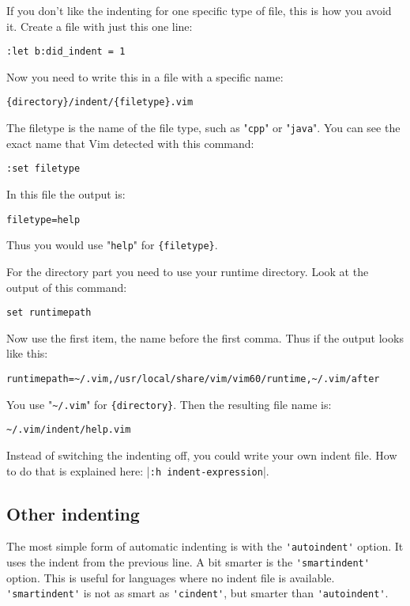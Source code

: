If you don't like the indenting for one specific type of file, this is how you avoid it.
Create a file with just this one line:

\begin{Verbatim}[samepage=true]
 :let b:did_indent = 1
\end{Verbatim}

Now you need to write this in a file with a specific name:

\begin{Verbatim}[samepage=true]
    {directory}/indent/{filetype}.vim
\end{Verbatim}

The {filetype} is the name of the file type, such as "\verb!cpp!" or "\verb!java!".
You can see the exact name that Vim detected with this command:

\begin{Verbatim}[samepage=true]
 :set filetype
\end{Verbatim}

In this file the output is:

\begin{Verbatim}[samepage=true]
    filetype=help 
\end{Verbatim}

Thus you would use "\verb!help!" for \verb!{filetype}!.

For the {directory} part you need to use your runtime directory.
Look at the output of this command:

\begin{Verbatim}[samepage=true]
 set runtimepath
\end{Verbatim}

Now use the first item, the name before the first comma.
Thus if the output looks like this:

\begin{Verbatim}[samepage=true]
    runtimepath=~/.vim,/usr/local/share/vim/vim60/runtime,~/.vim/after 
\end{Verbatim}

You use "\verb!~/.vim!" for \verb!{directory}!.
Then the resulting file name is:

\begin{Verbatim}[samepage=true]
    ~/.vim/indent/help.vim 
\end{Verbatim}

Instead of switching the indenting off, you could write your own indent file.
How to do that is explained here: |\verb!:h indent-expression!|.
\subsection{Other indenting}
The most simple form of automatic indenting is with the \verb!'autoindent'! option.
It uses the indent from the previous line.
A bit smarter is the \verb!'smartindent'! option.
This is useful for languages where no indent file is available.
\verb!'smartindent'! is not as smart as \verb!'cindent'!, but smarter than \verb!'autoindent'!.

